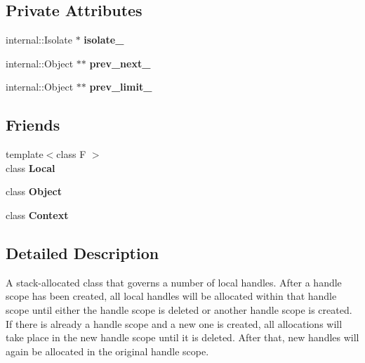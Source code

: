 \subsection*{Private Attributes}
\begin{DoxyCompactItemize}
\item 
internal\+::\+Isolate $\ast$ {\bfseries isolate\+\_\+}\hypertarget{classv8_1_1_handle_scope_a57195a6d30243f34c50b4293003cd242}{}\label{classv8_1_1_handle_scope_a57195a6d30243f34c50b4293003cd242}

\item 
internal\+::\+Object $\ast$$\ast$ {\bfseries prev\+\_\+next\+\_\+}\hypertarget{classv8_1_1_handle_scope_a739728a1286a7d92aaeb941db593fa1d}{}\label{classv8_1_1_handle_scope_a739728a1286a7d92aaeb941db593fa1d}

\item 
internal\+::\+Object $\ast$$\ast$ {\bfseries prev\+\_\+limit\+\_\+}\hypertarget{classv8_1_1_handle_scope_a8c56251528a986904e67f28b36900bd9}{}\label{classv8_1_1_handle_scope_a8c56251528a986904e67f28b36900bd9}

\end{DoxyCompactItemize}
\subsection*{Friends}
\begin{DoxyCompactItemize}
\item 
{\footnotesize template$<$class F $>$ }\\class {\bfseries Local}\hypertarget{classv8_1_1_handle_scope_afb872edb4aac7ba55f0da004113aa2b0}{}\label{classv8_1_1_handle_scope_afb872edb4aac7ba55f0da004113aa2b0}

\item 
class {\bfseries Object}\hypertarget{classv8_1_1_handle_scope_a0720b5f434e636e22a3ed34f847eec57}{}\label{classv8_1_1_handle_scope_a0720b5f434e636e22a3ed34f847eec57}

\item 
class {\bfseries Context}\hypertarget{classv8_1_1_handle_scope_ac26c806e60ca4a0547680edb68f6e39b}{}\label{classv8_1_1_handle_scope_ac26c806e60ca4a0547680edb68f6e39b}

\end{DoxyCompactItemize}


\subsection{Detailed Description}
A stack-\/allocated class that governs a number of local handles. After a handle scope has been created, all local handles will be allocated within that handle scope until either the handle scope is deleted or another handle scope is created. If there is already a handle scope and a new one is created, all allocations will take place in the new handle scope until it is deleted. After that, new handles will again be allocated in the original handle scope.

